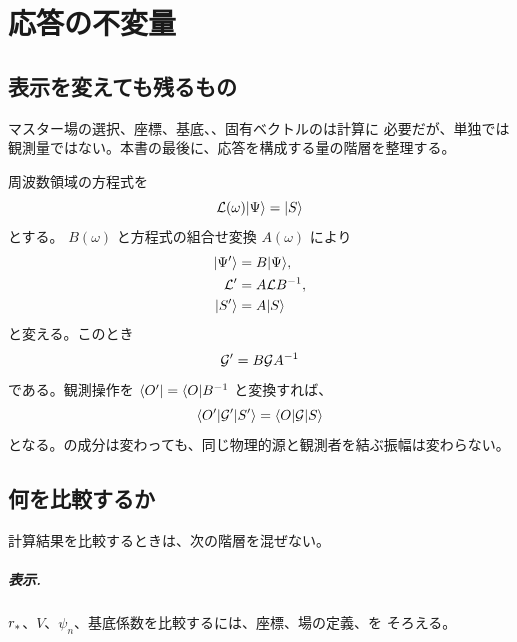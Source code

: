 \chapter{応答の不変量}
\label{chap:response-invariants}

\section{表示を変えても残るもの}

マスター場の選択、座標、基底、、固有ベクトルのは計算に
必要だが、単独では観測量ではない。本書の最後に、応答を構成する量の階層を整理する。

周波数領域の方程式を
\begin{equation}
\mathcal{L}(\omega)\lvert \Psi \rangle
=
\lvert S \rangle
\end{equation}
とする。 $B(\omega)$ と方程式の組合せ変換 $A(\omega)$ により
\begin{align}
\lvert \Psi' \rangle
&=
B\lvert \Psi \rangle,
\\
\mathcal{L}'
&=
A\mathcal{L} B^{-1},
\\
\lvert S' \rangle
&=
A\lvert S \rangle
\end{align}
と変える。このとき
\begin{equation}
\mathcal{G}'
=
B\mathcal{G} A^{-1}
\label{eq:green-field-redefinition}
\end{equation}
である。観測操作を $\langle O' \rvert=\langle O \rvert B^{-1}$ と変換すれば、
\begin{equation}
\langle O' \rvert\mathcal{G}'\lvert S' \rangle
=
\langle O \rvert\mathcal{G}\lvert S \rangle
\label{eq:physical-amplitude-invariant}
\end{equation}
となる。の成分は変わっても、同じ物理的源と観測者を結ぶ振幅は変わらない。

\section{何を比較するか}

計算結果を比較するときは、次の階層を混ぜない。

\paragraph{表示.}
$r_*$、$V$、$\psi_n$、基底係数を比較するには、座標、場の定義、を
そろえる。

